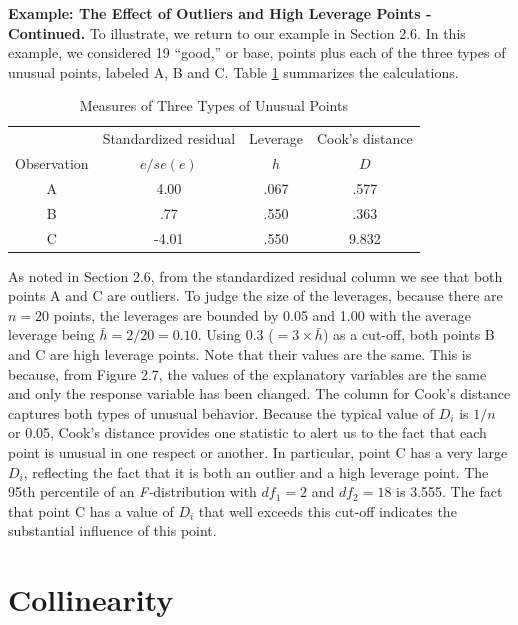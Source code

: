 \linejed

 \textbf{Example: The Effect of Outliers and High
Leverage Points - Continued.} To illustrate, we return to our
example in Section 2.6. In this example, we considered 19 ``good,''
or base, points plus each of the three types of unusual points,
labeled A, B and C. Table \ref{T5:Outliers} summarizes the
calculations.

\begin{table}[h]

\caption{\label{T5:Outliers} Measures of Three Types of Unusual
Points}
\begin{tabular}{cccc}
\hline
& Standardized residual & Leverage & Cook's distance \\
Observation & $e/se(e)$ & $h$ & $D$ \\ \hline
A & 4.00 & .067 & .577 \\
 B & .77 & .550 & .363 \\
C & -4.01 & .550 & 9.832 \\ \hline
\end{tabular}
\end{table}

As noted in Section 2.6, from the standardized residual column we
see that both points A and C are outliers. To judge the size of the
leverages, because there are $n=20$ points, the leverages are
bounded by 0.05 and 1.00 with the average leverage being
$\bar{h}=2/20=0.10$. Using 0.3 ($ = 3 \times  \bar{h}$) as a
cut-off, both points B and C are high leverage points. Note that
their values are the same. This is because, from Figure 2.7, the
values of the explanatory variables are the same and only the
response variable has been changed. The column for Cook's distance
captures both types of unusual behavior. Because the typical value
of $D_i$ is $1/n$ or 0.05, Cook's distance provides one statistic to
alert us to the fact that each point is unusual in one respect or
another. In particular, point C has a very large $D_i$, reflecting
the fact that it is both an outlier and a high leverage point. The
95th percentile of an \textit{F-}distribution with $df_1=2$ and
$df_2=18$ is 3.555. The fact that point C has a value of $D_i$ that
well exceeds this cut-off indicates the substantial influence of
this point.

\linejed

\section{Collinearity}

